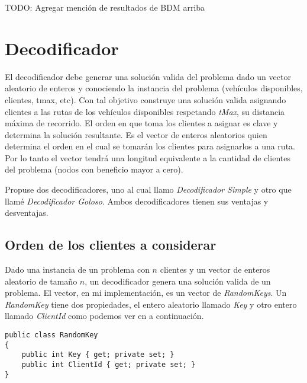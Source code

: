 TODO: Agregar mención de resultados de BDM arriba

\section{Decodificador}

El decodificador debe generar una solución valida del problema dado un vector aleatorio de enteros y conociendo la instancia del problema (vehículos disponibles, clientes, tmax, etc). Con tal objetivo construye una solución valida asignando clientes a las rutas de los vehículos disponibles respetando \textit{tMax}, su distancia máxima de recorrido. El orden en que toma los clientes a asignar es clave y determina la solución resultante. Es el vector de enteros aleatorios quien determina el orden en el cual se tomarán los clientes para asignarlos a una ruta. Por lo tanto el vector tendrá una longitud equivalente a la cantidad de clientes del problema (nodos con beneficio mayor a cero).

\bigskip

Propuse dos decodificadores, uno al cual llamo \textit{Decodificador Simple} y otro que llamé \textit{Decodificador Goloso}. Ambos decodificadores tienen sus ventajas y desventajas.

\subsection{Orden de los clientes a considerar}\label{sec:ordenDeco}

Dado una instancia de un problema con $n$ clientes y un vector de enteros aleatorio de tamaño $n$, un decodificador genera una solución valida de un problema. El vector, en mi implementación, es un vector de \textit{RandomKeys}. Un \textit{RandomKey} tiene dos propiedades, el entero aleatorio llamado \textit{Key} y otro entero llamado \textit{ClientId} como podemos ver en a continuación. 

\bigskip

\begin{lstlisting} 
public class RandomKey
{        
	public int Key { get; private set; }
	public int ClientId { get; private set; }
}
\end{lstlisting}

\bigskip

